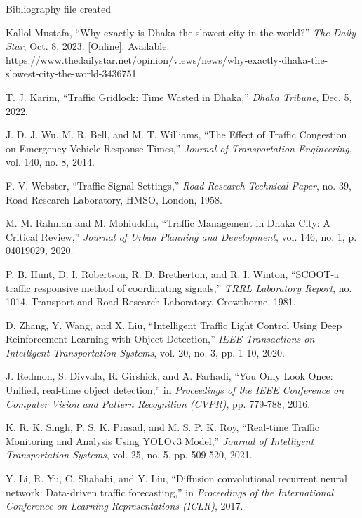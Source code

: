 Bibliography file created

\begin{thebibliography}{99}

Kallol Mustafa, ``Why exactly is Dhaka the slowest city in the world?'' \textit{The Daily Star}, Oct. 8, 2023. [Online]. Available: https://www.thedailystar.net/opinion/views/news/why-exactly-dhaka-the-slowest-city-the-world-3436751

T. J. Karim, ``Traffic Gridlock: Time Wasted in Dhaka,'' \textit{Dhaka Tribune}, Dec. 5, 2022.

J. D. J. Wu, M. R. Bell, and M. T. Williams, ``The Effect of Traffic Congestion on Emergency Vehicle Response Times,'' \textit{Journal of Transportation Engineering}, vol. 140, no. 8, 2014.

F. V. Webster, ``Traffic Signal Settings,'' \textit{Road Research Technical Paper}, no. 39, Road Research Laboratory, HMSO, London, 1958.

M. M. Rahman and M. Mohiuddin, ``Traffic Management in Dhaka City: A Critical Review,'' \textit{Journal of Urban Planning and Development}, vol. 146, no. 1, p. 04019029, 2020.

P. B. Hunt, D. I. Robertson, R. D. Bretherton, and R. I. Winton, ``SCOOT-a traffic responsive method of coordinating signals,'' \textit{TRRL Laboratory Report}, no. 1014, Transport and Road Research Laboratory, Crowthorne, 1981.

D. Zhang, Y. Wang, and X. Liu, ``Intelligent Traffic Light Control Using Deep Reinforcement Learning with Object Detection,'' \textit{IEEE Transactions on Intelligent Transportation Systems}, vol. 20, no. 3, pp. 1-10, 2020.

J. Redmon, S. Divvala, R. Girshick, and A. Farhadi, ``You Only Look Once: Unified, real-time object detection,'' in \textit{Proceedings of the IEEE Conference on Computer Vision and Pattern Recognition (CVPR)}, pp. 779-788, 2016.

K. R. K. Singh, P. S. K. Prasad, and M. S. P. K. Roy, ``Real-time Traffic Monitoring and Analysis Using YOLOv3 Model,'' \textit{Journal of Intelligent Transportation Systems}, vol. 25, no. 5, pp. 509-520, 2021.

Y. Li, R. Yu, C. Shahabi, and Y. Liu, ``Diffusion convolutional recurrent neural network: Data-driven traffic forecasting,'' in \textit{Proceedings of the International Conference on Learning Representations (ICLR)}, 2017.


\end{thebibliography}
